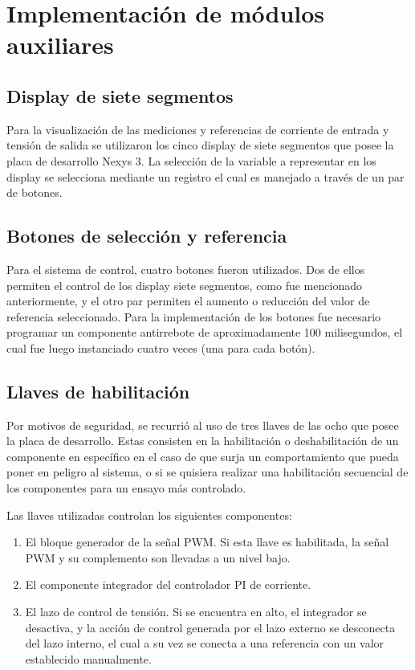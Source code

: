 \section{Implementación de módulos auxiliares}

\subsection{Display de siete segmentos}

Para la visualización de las mediciones y referencias de corriente de entrada y tensión de salida se utilizaron los cinco display de siete segmentos que posee la placa de desarrollo Nexys 3. La selección de la variable a representar en los display se selecciona mediante un registro el cual es manejado a través de un par de botones.

\subsection{Botones de selección y referencia}

Para el sistema de control, cuatro botones fueron utilizados. Dos de ellos permiten el control de los display siete segmentos, como fue mencionado anteriormente, y el otro par permiten el aumento o reducción del valor de referencia seleccionado. Para la implementación de los botones fue necesario programar un componente antirrebote de aproximadamente 100 milisegundos, el cual fue luego instanciado cuatro veces (una para cada botón).

\subsection{Llaves de habilitación}

Por motivos de seguridad, se recurrió al uso de tres llaves de las ocho que posee la placa de desarrollo. Estas consisten en la habilitación o deshabilitación de un componente en específico en el caso de que surja un comportamiento que pueda poner en peligro al sistema, o si se quisiera realizar una habilitación secuencial de los componentes para un ensayo más controlado.

Las llaves utilizadas controlan los siguientes componentes:

\begin{enumerate}
    \item El bloque generador de la señal PWM. Si esta llave es habilitada, la señal PWM y su complemento son llevadas a un nivel bajo.
    \item El componente integrador del controlador PI de corriente.  
    \item El lazo de control de tensión. Si se encuentra en alto, el integrador se desactiva, y la acción de control generada por el lazo externo se desconecta del lazo interno, el cual a su vez se conecta a una referencia con un valor establecido manualmente.
\end{enumerate}


